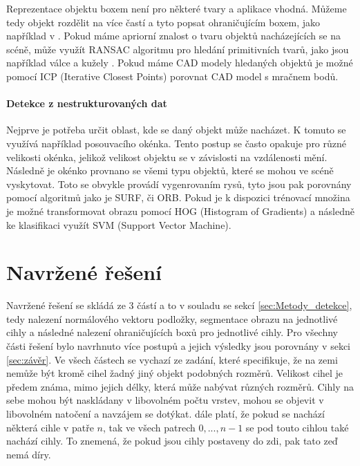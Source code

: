 \documentclass[twoside]{ctuthesis}
\begin{document}
Reprezentace objektu boxem není pro některé tvary a aplikace vhodná. Můžeme tedy objekt rozdělit na více častí a tyto popsat ohraničujícím boxem, jako například v \cite{huebner2008minimum}. Pokud máme apriorní znalost o tvaru objektů nacházejících se na scéně, může využít RANSAC algoritmu pro hledání primitivních tvarů, jako jsou například válce a kužely \cite{garcia2009fitting}. Pokud máme CAD modely hledaných objektů je možné pomocí ICP (Iterative Closest Points) porovnat CAD model s mračnem bodů. \cite{kim2014object}

\subsubsection{Detekce z nestrukturovaných dat}
Nejprve je potřeba určit oblast, kde se daný objekt může nacházet. K tomuto se využívá například posouvacího okénka. Tento postup se často opakuje pro různé velikosti okénka, jelikož velikost objektu se v závislosti na vzdálenosti mění. Následně je okénko provnano se všemi typu objektů, které se mohou ve scéně vyskytovat. Toto se obvykle provádí vygenrovaním rysů, tyto jsou pak porovnány pomocí algoritmů jako je SURF, či ORB. Pokud je k dispozici trénovací množina je možné transformovat obrazu pomocí HOG (Histogram of Gradients) a následně ke klasifikaci využít SVM (Support Vector Machine). \cite{lai2012detection, ward2019rgb}

\chapter{Navržené řešení}

Navržené řešení se skládá ze 3 částí a to v souladu se sekcí \ref{sec:Metody_detekce}, tedy nalezení normálového vektoru podložky, segmentace obrazu na jednotlivé cihly a následné nalezení ohraničujících boxů pro jednotlivé cihly. Pro všechny části řešení bylo navrhnuto více postupů a jejich výsledky jsou porovnány v sekci \ref{sec:závěr}. Ve všech částech se vychazí ze zadání, které specifikuje, že na zemi nemůže být kromě cihel žadný jiný objekt podobných rozměrů. Velikost cihel je předem známa, mimo jejich délky, která může nabývat různých rozměrů. Cihly na sebe mohou být naskládany v libovolném počtu vrstev, mohou se objevit v libovolném natočení a navzájem se dotýkat. dále platí, že pokud se nachází některá cihle v patře $n$, tak ve všech patrech $0,...,n-1$ se pod touto cihlou také nachází cihly. To znemená, že pokud jsou cihly postaveny do zdi, pak tato zeď nemá díry.
\end{document}
